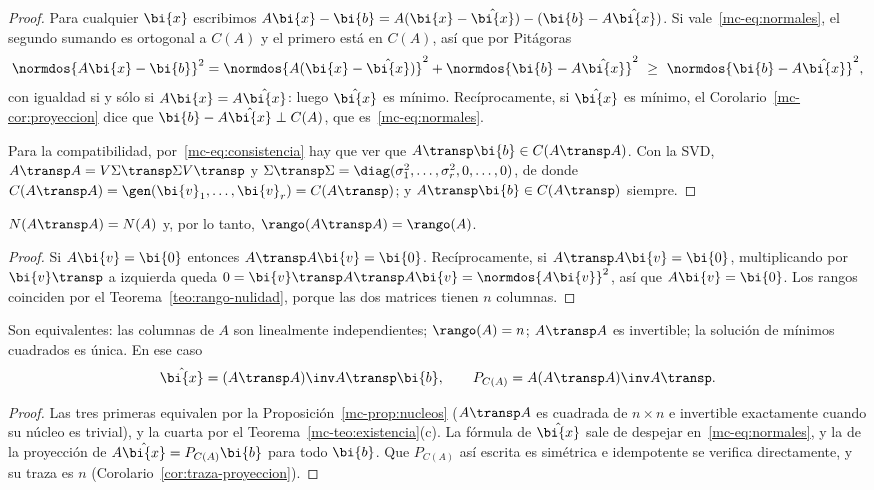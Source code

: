 \begin{proof}
Para cualquier $\bi{x}$ escribimos $A\bi{x}-\bi{b}=A(\bi{x}-\hat{\bi{x}})
-(\bi{b}-A\hat{\bi{x}})$. Si vale~\eqref{mc-eq:normales}, el segundo sumando
es ortogonal a $C(A)$ y el primero está en $C(A)$, así que por Pitágoras
\[
\normdos{A\bi{x}-\bi{b}}^2
=\normdos{A(\bi{x}-\hat{\bi{x}})}^2+\normdos{\bi{b}-A\hat{\bi{x}}}^2
\ \ge\ \normdos{\bi{b}-A\hat{\bi{x}}}^2 ,
\]
con igualdad si y sólo si $A\bi{x}=A\hat{\bi{x}}$: luego $\hat{\bi{x}}$ es
mínimo. Recíprocamente, si $\hat{\bi{x}}$ es mínimo, el
Corolario~\ref{mc-cor:proyeccion} dice que $\bi{b}-A\hat{\bi{x}}\perp C(A)$, que
es~\eqref{mc-eq:normales}.

Para la compatibilidad, por~\eqref{mc-eq:consistencia} hay que ver que
$A\transp\bi{b}\in C(A\transp A)$. Con la SVD,
$A\transp A=V\Sigma\transp\Sigma V\transp$ y
$\Sigma\transp\Sigma=\diag(\sigma_1^2,\dots,\sigma_r^2,0,\dots,0)$, de donde
$C(A\transp A)=\gen(\bi{v}_1,\dots,\bi{v}_r)=C(A\transp)$; y
$A\transp\bi{b}\in C(A\transp)$ siempre.
\end{proof}

\begin{proposition}\label{mc-prop:nucleos}
$N(A\transp A)=N(A)$ y, por lo tanto, $\rango(A\transp A)=\rango(A)$.
\end{proposition}

\begin{proof}
Si $A\bi{v}=\bi{0}$ entonces $A\transp A\bi{v}=\bi{0}$. Recíprocamente, si
$A\transp A\bi{v}=\bi{0}$, multiplicando por $\bi{v}\transp$ a izquierda queda
$0=\bi{v}\transp A\transp A\bi{v}=\normdos{A\bi{v}}^2$, así que $A\bi{v}=\bi{0}$.
Los rangos coinciden por el Teorema~\ref{teo:rango-nulidad}, porque las dos
matrices tienen $n$ columnas.
\end{proof}

\begin{corollary}\label{mc-cor:rango-completo}
Son equivalentes: las columnas de $A$ son linealmente independientes;
$\rango(A)=n$; $A\transp A$ es invertible; la solución de mínimos cuadrados es
única. En ese caso
\[
\hat{\bi{x}}=(A\transp A)\inv A\transp\bi{b},
\qquad
P_{C(A)}=A(A\transp A)\inv A\transp .
\]
\end{corollary}

\begin{proof}
Las tres primeras equivalen por la Proposición~\ref{mc-prop:nucleos}
($A\transp A$ es cuadrada de $n\times n$ e invertible exactamente cuando su
núcleo es trivial), y la cuarta por el
Teorema~\ref{mc-teo:existencia}(c). La fórmula de $\hat{\bi{x}}$ sale de
despejar en~\eqref{mc-eq:normales}, y la de la proyección de
$A\hat{\bi{x}}=P_{C(A)}\bi{b}$ para todo $\bi{b}$. Que $P_{C(A)}$ así escrita es
simétrica e idempotente se verifica directamente, y su traza es $n$
(Corolario~\ref{cor:traza-proyeccion}).
\end{proof}


